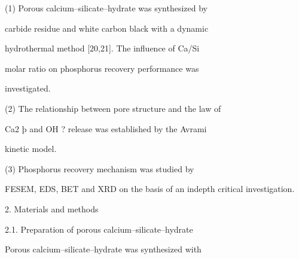 \documentclass[a4paper,portrait,12pt]{article}
\begin{document}
\begin{flushleft}
(1) Porous calcium--silicate--hydrate was synthesized by
\end{flushleft}


\begin{flushleft}
carbide residue and white carbon black with a dynamic
\end{flushleft}


\begin{flushleft}
hydrothermal method [20,21]. The inﬂuence of Ca/Si
\end{flushleft}


\begin{flushleft}
molar ratio on phosphorus recovery performance was
\end{flushleft}


\begin{flushleft}
investigated.
\end{flushleft}


\begin{flushleft}
(2) The relationship between pore structure and the law of
\end{flushleft}


\begin{flushleft}
Ca2 þ and OH ? release was established by the Avrami
\end{flushleft}


\begin{flushleft}
kinetic model.
\end{flushleft}


\begin{flushleft}
(3) Phosphorus recovery mechanism was studied by
\end{flushleft}


\begin{flushleft}
FESEM, EDS, BET and XRD on the basis of an indepth critical investigation.
\end{flushleft}





\begin{flushleft}
2. Materials and methods
\end{flushleft}


\begin{flushleft}
2.1. Preparation of porous calcium--silicate--hydrate
\end{flushleft}


\begin{flushleft}
Porous calcium--silicate--hydrate was synthesized with
\end{flushleft}
\end{document}
